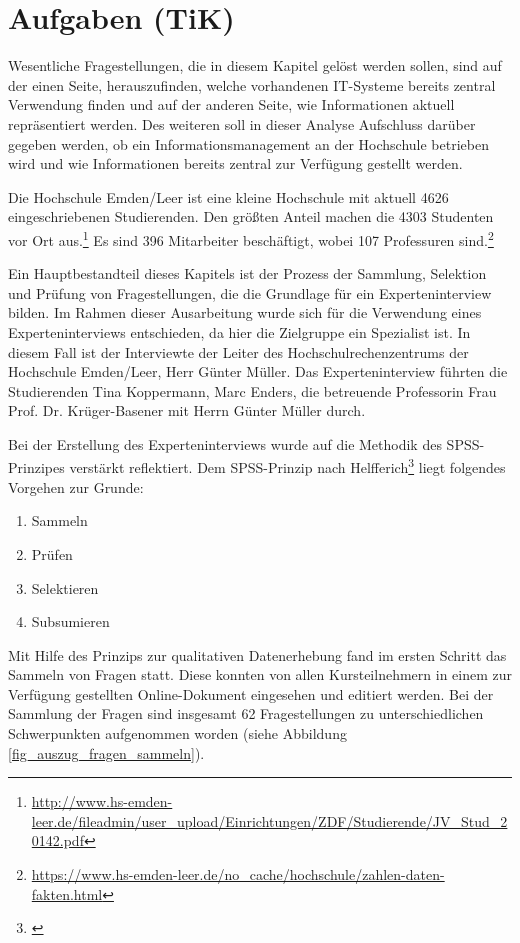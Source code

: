 \section{Aufgaben (TiK)}
Wesentliche Fragestellungen, die in diesem Kapitel gelöst werden sollen, sind auf der einen Seite, herauszufinden, welche vorhandenen IT-Systeme bereits zentral Verwendung finden und auf der anderen Seite, wie Informationen aktuell repräsentiert werden. Des weiteren soll in dieser Analyse Aufschluss darüber gegeben werden, ob ein Informationsmanagement an der Hochschule betrieben wird und wie Informationen bereits zentral zur Verfügung gestellt werden.

Die Hochschule Emden/Leer ist eine kleine Hochschule mit aktuell 4626 eingeschriebenen Studierenden. Den größten Anteil machen die 4303 Studenten vor Ort aus.\footnote{\url{http://www.hs-emden-leer.de/fileadmin/user_upload/Einrichtungen/ZDF/Studierende/JV_Stud_20142.pdf}} Es sind 396 Mitarbeiter beschäftigt, wobei 107 Professuren sind.\footnote{\url{https://www.hs-emden-leer.de/no_cache/hochschule/zahlen-daten-fakten.html}}

Ein Hauptbestandteil dieses Kapitels ist der Prozess der Sammlung, Selektion und Prüfung von Fragestellungen, die die Grundlage für ein Experteninterview bilden. Im Rahmen dieser Ausarbeitung wurde sich für die Verwendung eines Experteninterviews entschieden, da hier die Zielgruppe ein Spezialist ist. In diesem Fall ist der Interviewte der Leiter des Hochschulrechenzentrums der Hochschule Emden/Leer, Herr Günter Müller. Das Experteninterview führten die Studierenden Tina Koppermann, Marc Enders, die betreuende Professorin Frau Prof. Dr. Krüger-Basener mit Herrn Günter Müller durch. 

Bei der Erstellung des Experteninterviews wurde auf die Methodik des SPSS-Prinzipes verstärkt reflektiert. Dem SPSS-Prinzip nach Helfferich\footnote{\cite{helfferich_2009}} liegt folgendes Vorgehen zur Grunde:

\begin{enumerate}
	\item Sammeln
	\item Prüfen
	\item Selektieren
	\item Subsumieren		
\end{enumerate}

Mit Hilfe des Prinzips zur qualitativen Datenerhebung fand im ersten Schritt das Sammeln von Fragen statt. Diese konnten von allen Kursteilnehmern in einem zur Verfügung gestellten Online-Dokument eingesehen und editiert werden. Bei der Sammlung der Fragen sind insgesamt 62 Fragestellungen zu unterschiedlichen Schwerpunkten aufgenommen worden (siehe Abbildung \ref{fig_auszug_fragen_sammeln}).

